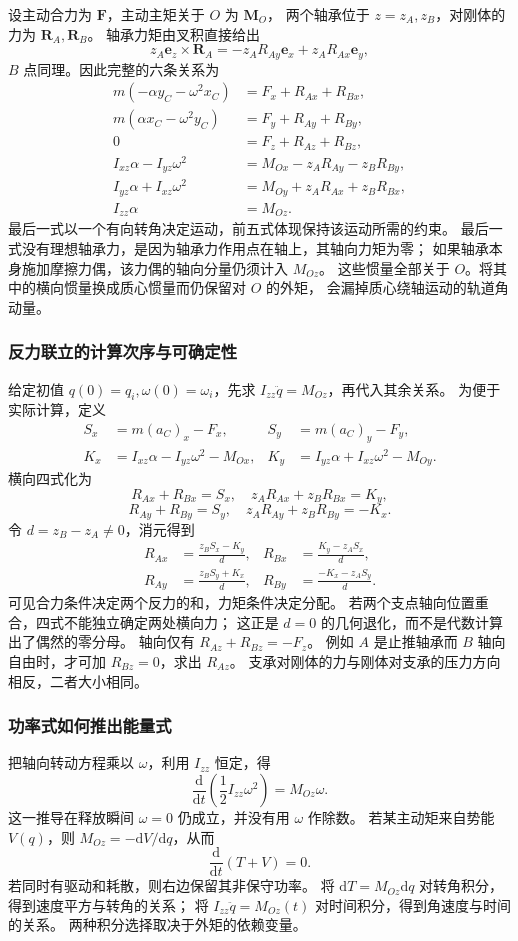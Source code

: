 \documentclass[UTF8,zihao=-4,fontset=fandol,a4paper]{ctexart}
\newcommand{\vect}[1]{\bm{#1}}
\newcommand{\dd}{\mathrm d}
\begin{document}
设主动合力为 $\vect F$，主动主矩关于 $O$ 为 $\vect M_O$，
两个轴承位于 $z=z_A,z_B$，对刚体的力为 $\vect R_A,\vect R_B$。
轴承力矩由叉积直接给出
\[
z_A\vect e_z\times\vect R_A
=-z_AR_{Ay}\vect e_x+z_AR_{Ax}\vect e_y,
\]
$B$ 点同理。因此完整的六条关系为
\begin{align*}
m(-\alpha y_C-\omega^2x_C)&=F_x+R_{Ax}+R_{Bx},\\
m(\alpha x_C-\omega^2y_C)&=F_y+R_{Ay}+R_{By},\\
0&=F_z+R_{Az}+R_{Bz},\\
I_{xz}\alpha-I_{yz}\omega^2&=M_{Ox}-z_AR_{Ay}-z_BR_{By},\\
I_{yz}\alpha+I_{xz}\omega^2&=M_{Oy}+z_AR_{Ax}+z_BR_{Bx},\\
I_{zz}\alpha&=M_{Oz}.
\end{align*}
最后一式以一个有向转角决定运动，前五式体现保持该运动所需的约束。
最后一式没有理想轴承力，是因为轴承力作用点在轴上，其轴向力矩为零；
如果轴承本身施加摩擦力偶，该力偶的轴向分量仍须计入 $M_{Oz}$。
这些惯量全部关于 $O$。将其中的横向惯量换成质心惯量而仍保留对 $O$ 的外矩，
会漏掉质心绕轴运动的轨道角动量。

\subsubsection*{反力联立的计算次序与可确定性}
给定初值 $q(0)=q_i,\omega(0)=\omega_i$，先求
$I_{zz}\ddot q=M_{Oz}$，再代入其余关系。
为便于实际计算，定义
\begin{align*}
S_x&=m(a_C)_x-F_x,&S_y&=m(a_C)_y-F_y,\\
K_x&=I_{xz}\alpha-I_{yz}\omega^2-M_{Ox},&
K_y&=I_{yz}\alpha+I_{xz}\omega^2-M_{Oy}.
\end{align*}
横向四式化为
\[
R_{Ax}+R_{Bx}=S_x,\quad z_AR_{Ax}+z_BR_{Bx}=K_y,
\]
\[
R_{Ay}+R_{By}=S_y,\quad z_AR_{Ay}+z_BR_{By}=-K_x.
\]
令 $d=z_B-z_A\ne0$，消元得到
\begin{align*}
R_{Ax}&=\frac{z_BS_x-K_y}{d},&
R_{Bx}&=\frac{K_y-z_AS_x}{d},\\
R_{Ay}&=\frac{z_BS_y+K_x}{d},&
R_{By}&=\frac{-K_x-z_AS_y}{d}.
\end{align*}
可见合力条件决定两个反力的和，力矩条件决定分配。
若两个支点轴向位置重合，四式不能独立确定两处横向力；
这正是 $d=0$ 的几何退化，而不是代数计算出了偶然的零分母。
轴向仅有 $R_{Az}+R_{Bz}=-F_z$。
例如 $A$ 是止推轴承而 $B$ 轴向自由时，才可加 $R_{Bz}=0$，求出 $R_{Az}$。
支承对刚体的力与刚体对支承的压力方向相反，二者大小相同。

\subsubsection*{功率式如何推出能量式}
把轴向转动方程乘以 $\omega$，利用 $I_{zz}$ 恒定，得
\[
\frac{\dd}{\dd t}\left(\frac12I_{zz}\omega^2\right)
=M_{Oz}\omega.
\]
这一推导在释放瞬间 $\omega=0$ 仍成立，并没有用 $\omega$ 作除数。
若某主动矩来自势能 $V(q)$，则 $M_{Oz}=-\dd V/\dd q$，从而
\[
\frac{\dd}{\dd t}(T+V)=0.
\]
若同时有驱动和耗散，则右边保留其非保守功率。
将 $\dd T=M_{Oz}\dd q$ 对转角积分，得到速度平方与转角的关系；
将 $I_{zz}\ddot q=M_{Oz}(t)$ 对时间积分，得到角速度与时间的关系。
两种积分选择取决于外矩的依赖变量。
\end{document}
